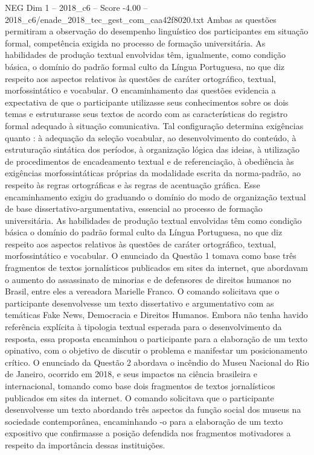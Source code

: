 \begin{textsample}{NEG Dim 1 – 2018\_c6 – Score -4.00 – 2018\_c6/enade\_2018\_tec\_gest\_com\_caa42f8020.txt}
Ambas as questões permitiram a observação do desempenho linguístico dos participantes em situação formal, competência exigida no processo de formação universitária.
As habilidades de produção textual envolvidas têm, igualmente, como condição básica, o domínio do padrão formal culto da Língua Portuguesa, no que diz respeito aos aspectos relativos às questões de caráter ortográfico, textual, morfossintático e vocabular.
O encaminhamento das questões evidencia a expectativa de que o participante utilizasse seus conhecimentos sobre os dois temas e estruturasse seus textos de acordo com as características do registro formal adequado à situação comunicativa.
Tal configuração determina exigências quanto : à adequação da seleção vocabular, ao desenvolvimento do conteúdo, à estruturação sintática dos períodos, à organização lógica das ideias, à utilização de procedimentos de encadeamento textual e de referenciação, à obediência às exigências morfossintáticas próprias da modalidade escrita da norma-padrão, ao respeito às regras ortográficas e às regras de acentuação gráfica.
Esse encaminhamento exigiu do graduando o domínio do modo de organização textual de base dissertativo-argumentativa, essencial ao processo de formação universitária.
As habilidades de produção textual envolvidas têm como condição básica o domínio do padrão formal culto da Língua Portuguesa, no que diz respeito aos aspectos relativos às questões de caráter ortográfico, textual, morfossintático e vocabular.
O enunciado da Questão 1 tomava como base três fragmentos de textos jornalísticos publicados em sites da internet, que abordavam o aumento do assassinato de minorias e de defensores de direitos humanos no Brasil, entre eles a vereadora Marielle Franco.
O comando solicitava que o participante desenvolvesse um texto dissertativo e argumentativo com as temáticas Fake News, Democracia e Direitos Humanos.
Embora não tenha havido referência explícita à tipologia textual esperada para o desenvolvimento da resposta, essa proposta encaminhou o participante para a elaboração de um texto opinativo, com o objetivo de discutir o problema e manifestar um posicionamento crítico.
O enunciado da Questão 2 abordava o incêndio do Museu Nacional do Rio de Janeiro, ocorrido em 2018, e seus impactos na ciência brasileira e internacional, tomando como base dois fragmentos de textos jornalísticos publicados em sites da internet.
O comando solicitava que o participante desenvolvesse um texto abordando três aspectos da função social dos museus na sociedade contemporânea, encaminhando -o para a elaboração de um texto expositivo que confirmasse a posição defendida nos fragmentos motivadores a respeito da importância dessas instituições.

\end{textsample}
